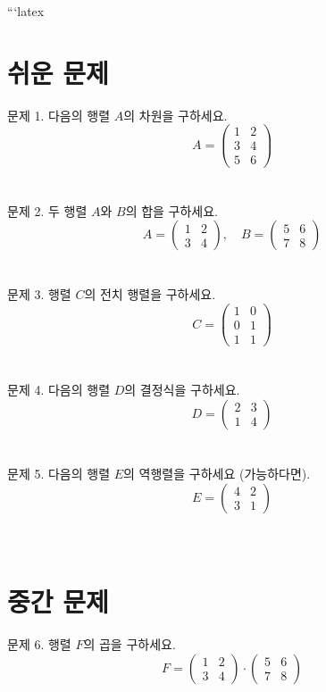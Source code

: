 \documentclass[fleqn]{article}
\begin{document}
      
        ```latex
\section*{쉬운 문제}

\noindent 문제 1. 다음의 행렬 $A$의 차원을 구하세요. $$A = \begin{pmatrix} 1 & 2 \\ 3 & 4 \\ 5 & 6 \end{pmatrix}$$ \\\\

\noindent 문제 2. 두 행렬 $A$와 $B$의 합을 구하세요. $$A = \begin{pmatrix} 1 & 2 \\ 3 & 4 \end{pmatrix}, \quad B = \begin{pmatrix} 5 & 6 \\ 7 & 8 \end{pmatrix}$$ \\\\

\noindent 문제 3. 행렬 $C$의 전치 행렬을 구하세요. $$C = \begin{pmatrix} 1 & 0 \\ 0 & 1 \\ 1 & 1 \end{pmatrix}$$ \\\\

\noindent 문제 4. 다음의 행렬 $D$의 결정식을 구하세요. $$D = \begin{pmatrix} 2 & 3 \\ 1 & 4 \end{pmatrix}$$ \\\\

\noindent 문제 5. 다음의 행렬 $E$의 역행렬을 구하세요 (가능하다면). $$E = \begin{pmatrix} 4 & 2 \\ 3 & 1 \end{pmatrix}$$ \\\\

\section*{중간 문제}

\noindent 문제 6. 행렬 $F$의 곱을 구하세요. $$F = \begin{pmatrix} 1 & 2 \\ 3 & 4 \end{pmatrix} \cdot \begin{pmatrix} 5 & 6 \\ 7 & 8 \end{pmatrix}$$ \\\\
\end{document}

